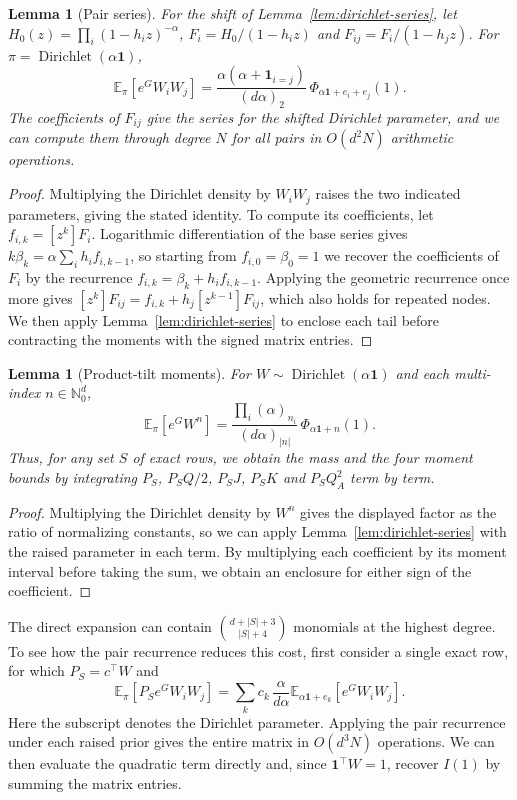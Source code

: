 \documentclass{article}
\numberwithin{equation}{section}
\newtheorem{lemma}[theorem]{Lemma}
\theoremstyle{remark}
\newcommand{\E}{\mathbb E}
\newcommand{\one}{\mathbf 1}
\begin{document}
\begin{lemma}[Pair series]\label{lem:pair-series}
For the shift of Lemma~\ref{lem:dirichlet-series}, let $H_0(z)=\prod_i(1-h_i z)^{-\alpha}$, $F_i=H_0/(1-h_i z)$
and $F_{ij}=F_i/(1-h_j z)$. For $\pi=\operatorname{Dirichlet}(\alpha\one)$,
\[
 \E_\pi[e^G W_iW_j]=\frac{\alpha(\alpha+\mathbf 1_{i=j})}
 {(d\alpha)_2}\,\Phi_{\alpha\one+e_i+e_j}(1).
\]
The coefficients of $F_{ij}$ give the series for the shifted Dirichlet
parameter, and we can compute them through degree $N$ for all pairs
in $O(d^2N)$ arithmetic operations.
\end{lemma}
\begin{proof}
Multiplying the Dirichlet density by $W_iW_j$ raises the two indicated
parameters, giving the stated identity. To compute its coefficients,
let $f_{i,k}=[z^k]F_i$. Logarithmic differentiation of the base series
gives $k\beta_k=\alpha\sum_i h_i f_{i,k-1}$, so starting from
$f_{i,0}=\beta_0=1$ we recover the coefficients of $F_i$ by the
recurrence $f_{i,k}=\beta_k+h_i f_{i,k-1}$. Applying the geometric
recurrence once more gives $[z^k]F_{ij}=f_{i,k}+h_j[z^{k-1}]F_{ij}$,
which also holds for repeated nodes. We then apply
Lemma~\ref{lem:dirichlet-series} to enclose each tail before
contracting the moments with the signed matrix entries.
\end{proof}

\begin{lemma}[Product-tilt moments]\label{lem:product-moments}
For $W\sim\operatorname{Dirichlet}(\alpha\one)$ and each
multi-index $n\in\mathbb N_0^d$,
\[
 \E_\pi[e^G W^n]=
 \frac{\prod_i(\alpha)_{n_i}}{(d\alpha)_{|n|}}\,
 \Phi_{\alpha\one+n}(1).
\]
Thus, for any set $S$ of exact rows, we obtain the mass and the four
moment bounds by integrating $P_S$, $P_S Q/2$, $P_S J$, $P_S K$ and
$P_S Q_A^2$ term by term.
\end{lemma}
\begin{proof}
Multiplying the Dirichlet density by $W^n$ gives the displayed
factor as the ratio of normalizing constants, so we can apply
Lemma~\ref{lem:dirichlet-series} with the raised parameter in each
term. By multiplying each coefficient by its moment interval before
taking the sum, we obtain an enclosure for either sign of the
coefficient.
\end{proof}

The direct expansion can contain $\binom{d+|S|+3}{|S|+4}$ monomials
at the highest degree. To see how the pair recurrence reduces this
cost, first consider a single exact row, for which $P_S=c^\top W$ and
\[
 \E_\pi[P_S e^G W_i W_j]=
 \sum_k c_k\,\frac{\alpha}{d\alpha}
 \E_{\alpha\one+e_k}[e^G W_i W_j].
\]
Here the subscript denotes the Dirichlet parameter. Applying the pair
recurrence under each raised prior gives the entire matrix in $O(d^3N)$
operations. We can then evaluate the quadratic term directly and,
since $\one^\top W=1$, recover $I(1)$ by summing the matrix entries.
\end{document}
